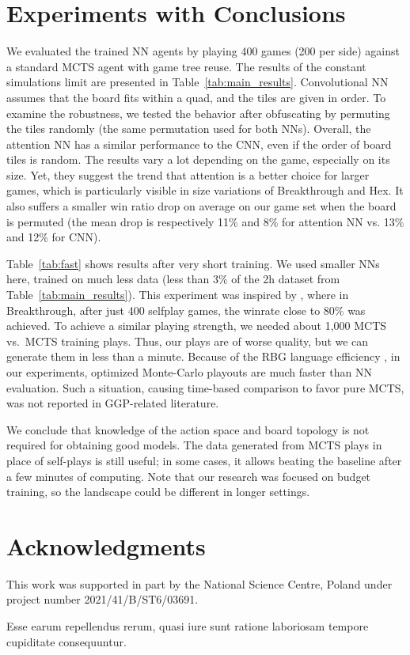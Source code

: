 \documentclass[letterpaper]{article} %
\begin{document}
\vspace{-0.94mm}
\vspace{-1.63mm}
\section{Experiments with Conclusions}

We evaluated the trained NN agents by playing 400 games (200 per side) against a standard MCTS agent with game tree reuse. The results of the constant simulations limit are presented in Table~\ref{tab:main_results}.
Convolutional NN assumes that the board fits within a quad, and the tiles are given in order.
To examine the robustness, we tested the behavior after obfuscating by permuting the tiles randomly (the same permutation used for both NNs).
Overall, the attention NN has a similar performance to the CNN, even if the order of board tiles is random. The results vary a lot depending on the game, especially on its size.
Yet, they suggest the trend that attention is a better choice for larger games, which is particularly visible in size variations of Breakthrough and Hex.
It also suffers a smaller win ratio drop on average on our game set when the board is permuted (the mean drop is respectively 11\% and 8\% for attention NN vs. 13\% and 12\% for CNN).

Table~\ref{tab:fast} shows results after very short training.
We used smaller NNs here, trained on much less data (less than $3\%$ of the 2h dataset from Table~\ref{tab:main_results}).
This experiment was inspired by \cite{ThielscherAAAI20}, where in Breakthrough, after just 400 selfplay games, the winrate close to 80\% was achieved.
To achieve a similar playing strength, we needed about 1,000 MCTS vs.\ MCTS training plays. Thus, our plays are of worse quality, but we can generate them in less than a minute.
Because of the RBG language efficiency \cite{Kowalski2020EfficientReasoning}, in our experiments, optimized Monte-Carlo playouts are much faster than NN evaluation. Such a situation, causing time-based comparison to favor pure MCTS, was not reported in GGP-related literature.

We conclude that knowledge of the action space and board topology is not required for obtaining good models.
The data generated from MCTS plays in place of self-plays is still useful; in some cases, it allows beating the baseline after a few minutes of computing.
Note that our research was focused on budget training, so the landscape could be different in longer settings.




\vspace{-0.90mm}
\vspace{-1.57mm}
\section{Acknowledgments}
This work was supported in part by the National Science Centre, Poland under project number 2021/41/B/ST6/03691.

Esse earum repellendus rerum, quasi iure sunt ratione laboriosam tempore cupiditate consequuntur.\clearpage

\end{document}

